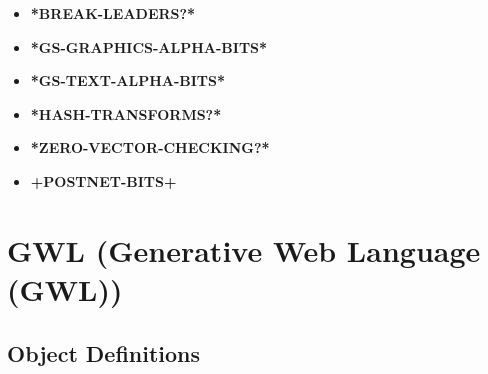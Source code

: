 \documentclass [11pt]{book}
\begin{document}
\begin{itemize}

\item {}
\textbf{*BREAK-LEADERS?*}





\item {}
\textbf{*GS-GRAPHICS-ALPHA-BITS*}





\item {}
\textbf{*GS-TEXT-ALPHA-BITS*}





\item {}
\textbf{*HASH-TRANSFORMS?*}





\item {}
\textbf{*ZERO-VECTOR-CHECKING?*}





\item {}
\textbf{+POSTNET-BITS+}





\end{itemize}





\section{GWL (Generative Web Language (GWL))}

\label{sec:gwl(generativeweblanguage(gwl))}





\subsection{Object Definitions}

\label{subsec:objectdefinitions}
\end{document}
